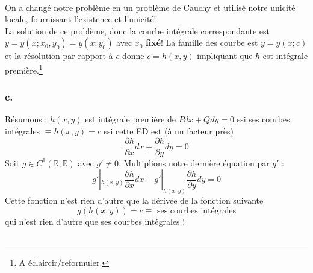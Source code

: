 	\ \\
	On a changé notre problème en un problème de Cauchy et utilisé 
	notre unicité locale, fournissant l'existence et l'unicité!\\
	La solution de ce problème, donc la courbe intégrale correspondante  
	est $y=y(x;x_0, y_0) = y(x;y_0)$ avec $x_0$ \textbf{fixé}! La 
	famille des courbe est $y = y(x;c)$ et la résolution par rapport à 
	$c$ donne $c=h(x,y)$ impliquant que $h$ est intégrale première.\footnote{
	A éclaircir/reformuler.}
	
	\subsubsection{c.}
	Résumons : $h(x,y)$ est intégrale première de $Pdx+Qdy=0$ ssi ses 
	courbes intégrales $\equiv h (x,y)=c$ ssi cette ED est (à un facteur 
	près)
	\begin{equation}
	\frac{\partial h}{\partial x}dx + \frac{\partial h}{\partial y}dy=0
	\end{equation}
	Soit $g \in C^1(\mathbb{R},\mathbb{R})$ avec $g'\neq0$. Multiplions 
	notre dernière équation par $g'$ :
	\begin{equation}
	g'|_{h(x,y)}\frac{\partial h}{\partial x}dx + g'|_{h(x,y)}\frac{
	\partial h}{\partial y}dy = 0
	\end{equation}
	Cette fonction n'est rien d'autre que la dérivée de la fonction 
	suivante 
	\begin{equation}
	g(h(x,y)) = c \equiv \text{ ses courbes intégrales}
	\end{equation}
	qui n'est rien d'autre que ses courbes intégrales !\\
		
	\
	
